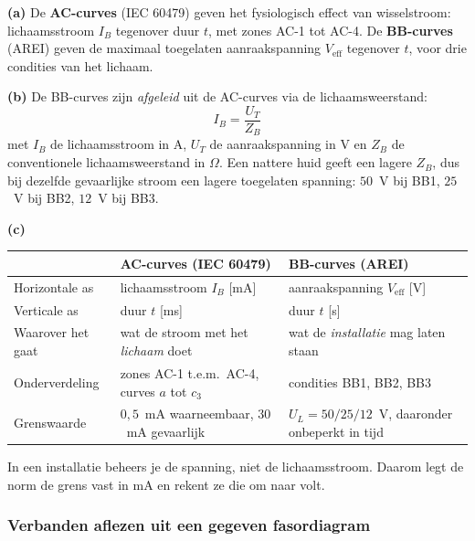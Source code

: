 \documentclass[a4paper,11pt]{article}
\begin{document}
\begin{oefenblok}[Antwoord]
    \textbf{(a)} De \textbf{AC-curves} (IEC 60479) geven het fysiologisch effect van wisselstroom:
    lichaamsstroom $I_B$ tegenover duur $t$, met zones AC-1 tot AC-4. De \textbf{BB-curves} (AREI)
    geven de maximaal toegelaten aanraakspanning $V_{\text{eff}}$ tegenover $t$, voor drie condities
    van het lichaam.

    \textbf{(b)} De BB-curves zijn \emph{afgeleid} uit de AC-curves via de lichaamsweerstand:
    \[I_B = \frac{U_T}{Z_B}\]
    met $I_B$ de lichaamsstroom in A, $U_T$ de aanraakspanning in V en $Z_B$ de conventionele
    lichaamsweerstand in $\Omega$. Een nattere huid geeft een lagere $Z_B$, dus bij dezelfde
    gevaarlijke stroom een lagere toegelaten spanning: $50$~V bij BB1, $25$~V bij BB2, $12$~V bij BB3.

    \textbf{(c)}
\begin{center}
        \begin{tabular}{@{}p{26mm}p{50mm}p{50mm}@{}}
            \toprule
                              & \textbf{AC-curves (IEC 60479)}                & \textbf{BB-curves (AREI)}                            \\
            \midrule
            Horizontale as    & lichaamsstroom $I_B$ [mA]                     & aanraakspanning $V_{\text{eff}}$ [V]                 \\[1mm]
            Verticale as      & duur $t$ [ms]                                 & duur $t$ [s]                                         \\[1mm]
            Waarover het gaat & wat de stroom met het \emph{lichaam} doet     & wat de \emph{installatie} mag laten staan            \\[1mm]
            Onderverdeling    & zones AC-1 t.e.m.\ AC-4, curves $a$ tot $c_3$ & condities BB1, BB2, BB3                              \\[1mm]
            Grenswaarde       & $0{,}5$~mA waarneembaar, $30$~mA gevaarlijk   & $U_L = 50/25/12$~V, daaronder onbeperkt in tijd      \\
            \bottomrule
        \end{tabular}
    \end{center}
    In een installatie beheers je de spanning, niet de lichaamsstroom. Daarom legt de norm de grens
    vast in mA en rekent ze die om naar volt.
\end{oefenblok}

\subsubsection{Verbanden aflezen uit een gegeven fasordiagram}
\end{document}
